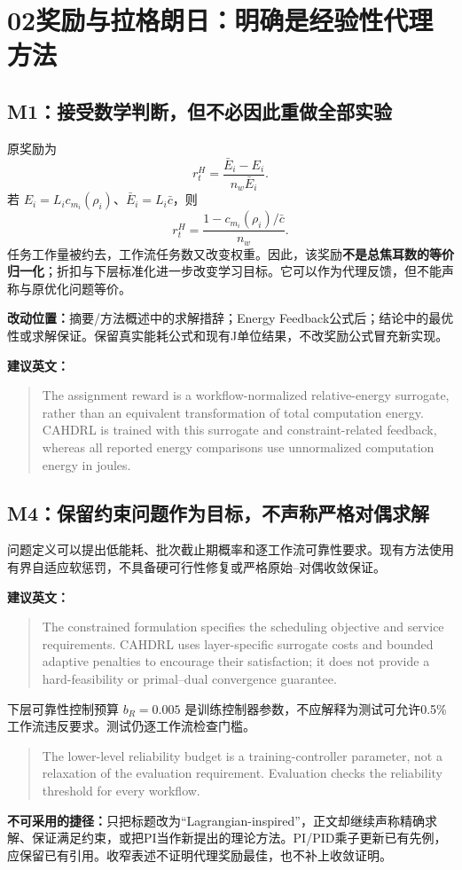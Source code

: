 \documentclass[UTF8,11pt,a4paper,fontset=fandol]{ctexart}
\newenvironment{draft}{\begin{quote}\small\setlength{\parskip}{4pt}}{\end{quote}}
\newcommand{\partpage}[2]{\section*{#1\quad #2}}
\begin{document}
\newpage
\partpage{02}{奖励与拉格朗日：明确是经验性代理方法}
\subsection*{M1：接受数学判断，但不必因此重做全部实验}
原奖励为
\[
r_t^H=\frac{\bar E_i-E_i}{n_w\bar E_i}.
\]
若 $E_i=L_i c_{m_i}(\rho_i)$、$\bar E_i=L_i\bar c$，则
\[
r_t^H=\frac{1-c_{m_i}(\rho_i)/\bar c}{n_w}.
\]
任务工作量被约去，工作流任务数又改变权重。因此，该奖励\textbf{不是总焦耳数的等价归一化}；折扣与下层标准化进一步改变学习目标。它可以作为代理反馈，但不能声称与原优化问题等价。

\textbf{改动位置：}摘要/方法概述中的求解措辞；Energy Feedback公式后；结论中的最优性或求解保证。保留真实能耗公式和现有J单位结果，不改奖励公式冒充新实现。

\textbf{建议英文：}
\begin{draft}
The assignment reward is a workflow-normalized relative-energy surrogate, rather than an equivalent transformation of total computation energy. CAHDRL is trained with this surrogate and constraint-related feedback, whereas all reported energy comparisons use unnormalized computation energy in joules.
\end{draft}

\subsection*{M4：保留约束问题作为目标，不声称严格对偶求解}
问题定义可以提出低能耗、批次截止期概率和逐工作流可靠性要求。现有方法使用有界自适应软惩罚，不具备硬可行性修复或严格原始--对偶收敛保证。

\textbf{建议英文：}
\begin{draft}
The constrained formulation specifies the scheduling objective and service requirements. CAHDRL uses layer-specific surrogate costs and bounded adaptive penalties to encourage their satisfaction; it does not provide a hard-feasibility or primal--dual convergence guarantee.
\end{draft}

下层可靠性控制预算 $b_R=0.005$ 是训练控制器参数，不应解释为测试可允许0.5\%工作流违反要求。测试仍逐工作流检查门槛。
\begin{draft}
The lower-level reliability budget is a training-controller parameter, not a relaxation of the evaluation requirement. Evaluation checks the reliability threshold for every workflow.
\end{draft}

\begin{risk}
\textbf{不可采用的捷径：}只把标题改为“Lagrangian-inspired”，正文却继续声称精确求解、保证满足约束，或把PI当作新提出的理论方法。PI/PID乘子更新已有先例，应保留已有引用。收窄表述不证明代理奖励最佳，也不补上收敛证明。
\end{risk}
\end{document}
